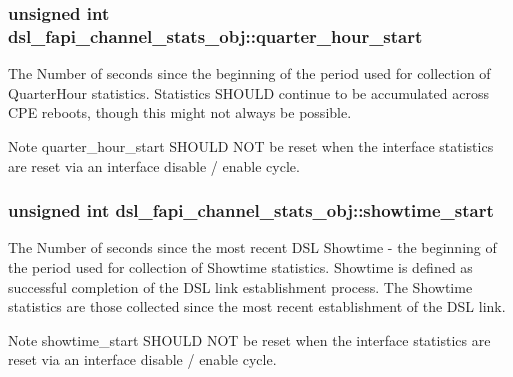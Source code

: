 \hypertarget{structdsl__fapi__channel__stats__obj_aaa1e938c3a0d66c370fd3c49b178f907}{
\subsubsection[{quarter\-\_\-hour\-\_\-start}]{\setlength{\rightskip}{0pt plus 5cm}unsigned int dsl\-\_\-fapi\-\_\-channel\-\_\-stats\-\_\-obj\-::quarter\-\_\-hour\-\_\-start}}\label{structdsl__fapi__channel__stats__obj_aaa1e938c3a0d66c370fd3c49b178f907}
The Number of seconds since the beginning of the period used for collection of Quarter\-Hour statistics. Statistics S\-H\-O\-U\-L\-D continue to be accumulated across C\-P\-E reboots, though this might not always be possible. \begin{DoxyNote}{Note}
quarter\-\_\-hour\-\_\-start S\-H\-O\-U\-L\-D N\-O\-T be reset when the interface statistics are reset via an interface disable / enable cycle. 
\end{DoxyNote}
\hypertarget{structdsl__fapi__channel__stats__obj_ab49f9ff4bdff8cb3538236a8ce128f4b}{
\subsubsection[{showtime\-\_\-start}]{\setlength{\rightskip}{0pt plus 5cm}unsigned int dsl\-\_\-fapi\-\_\-channel\-\_\-stats\-\_\-obj\-::showtime\-\_\-start}}\label{structdsl__fapi__channel__stats__obj_ab49f9ff4bdff8cb3538236a8ce128f4b}
The Number of seconds since the most recent D\-S\-L Showtime -\/ the beginning of the period used for collection of Showtime statistics. Showtime is defined as successful completion of the D\-S\-L link establishment process. The Showtime statistics are those collected since the most recent establishment of the D\-S\-L link. \begin{DoxyNote}{Note}
showtime\-\_\-start S\-H\-O\-U\-L\-D N\-O\-T be reset when the interface statistics are reset via an interface disable / enable cycle. 
\end{DoxyNote}
